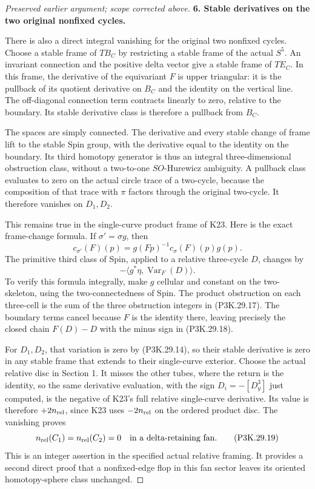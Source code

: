 \begin{proof}[Preserved earlier argument; scope corrected above]
\par\medskip\noindent\textbf{6. Stable derivatives on the two original nonfixed cycles.}\enspace

There is also a direct integral vanishing for the original
two nonfixed cycles. Choose a stable frame of \(TB_C\)
by restricting a stable frame of the actual \(S^5\).
An invariant connection and the positive delta vector
give a stable frame of \(TE_C\). In this frame, the
derivative of the equivariant \(F\) is upper triangular:
it is the pullback of its quotient derivative on \(B_C\)
and the identity on the vertical line. The off-diagonal
connection term contracts linearly to zero, relative
to the boundary. Its stable derivative class is therefore
a pullback from \(B_C\).

The spaces are simply connected. The derivative and every
stable change of frame lift to the stable Spin group,
with the derivative equal to the identity on the boundary.
Its third homotopy generator is thus an integral
three-dimensional obstruction class, without a
two-to-one \(SO\)-Hurewicz ambiguity. A pullback class
evaluates to zero on the actual circle trace of a
two-cycle, because the composition of that trace with
\(\pi\) factors through the original two-cycle.
It therefore vanishes on \(D_1,D_2\).

This remains true in the single-curve product frame of
K23. Here is the exact frame-change formula. If
\(\sigma'=\sigma g\), then
\[
       c_{\sigma'}(F)(p)=
       g(Fp)^{-1}c_\sigma(F)(p)g(p).
                                                        \tag{P3K.29.17}
\]
The primitive third class of Spin, applied to a relative
three-cycle \(D\), changes by
\[
              -\langle g^*\eta,\operatorname{Var}_F(D)\rangle.
                                                        \tag{P3K.29.18}
\]
To verify this formula integrally, make \(g\) cellular and
constant on the two-skeleton, using the two-connectedness
of Spin. The product obstruction on each three-cell is
the sum of the three obstruction integers in
(P3K.29.17). The boundary terms cancel because \(F\) is
the identity there, leaving precisely the closed chain
\(F(D)-D\) with the minus sign in (P3K.29.18).

For \(D_1,D_2\), that variation is zero by
(P3K.29.14), so their stable derivative is zero in any
stable frame that extends to their single-curve exterior.
Choose the actual relative disc in Section 1. It misses
the other tubes, where the return is the identity, so the
same derivative evaluation, with the sign \(D_i=-[D^3_y]\)
just computed, is the negative of K23's full relative
single-curve derivative. Its value is therefore
\(+2n_{\rm rel}\), since K23 uses \(-2n_{\rm rel}\) on
the ordered product disc. The vanishing proves
\[
         n_{\rm rel}(C_1)=n_{\rm rel}(C_2)=0
             \quad\hbox{in a delta-retaining fan}.
                                                        \tag{P3K.29.19}
\]
This is an integer assertion in the specified actual
relative framing. It provides a second direct proof that
a nonfixed-edge flop in this fan sector leaves its
oriented homotopy-sphere class unchanged.


\end{proof}
